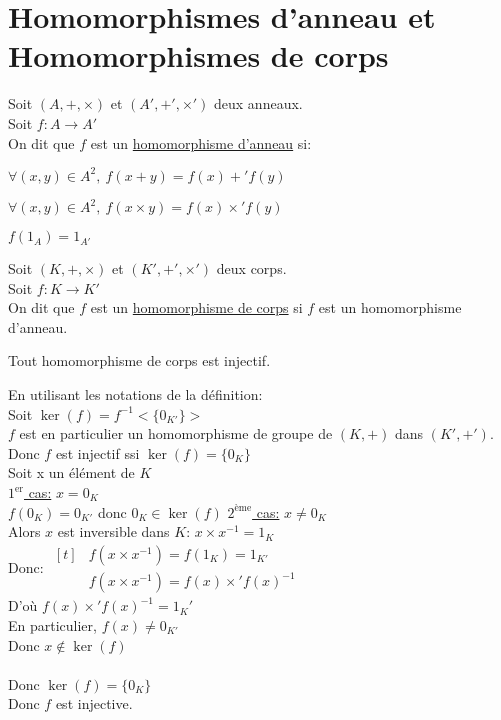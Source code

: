 \documentclass[12pt,twoside,a4paper]{article}
\begin{document}
	\section{Homomorphismes d'anneau et Homomorphismes de corps}
		\begin{defi}
			Soit $(A,+,\times)$ et $(A',+',\times')$ deux anneaux.\\
			Soit $f:A\rightarrow A'$\\
			On dit que $f$ est un \underline{homomorphisme d'anneau} si:
			\begin{liste}
				\item $\forall(x,y)\in A^2,\ f(x+y)=f(x)+'f(y)$
				\item $\forall(x,y)\in A^2,\ f(x\times y)=f(x)\times'f(y)$
				\item $f(1_A)=1_{A'}$
			\end{liste}
		\end{defi}
		\begin{defi}
				Soit $(K,+,\times)$ et $(K',+',\times')$ deux corps.\\
				Soit $f:K\rightarrow K'$\\
				On dit que $f$ est un \underline{homomorphisme de corps} si $f$ est un homomorphisme d'anneau.
		\end{defi}
		\begin{prop}
			Tout homomorphisme de corps est injectif.
		\end{prop}
		\begin{preuve}
			En utilisant les notations de la définition:\\
			Soit $\ker(f)=f^{-1}<\{0_{K'}\}>$\\
			$f$ est en particulier un homomorphisme de groupe de $(K,+)$ dans $(K',+')$. Donc $f$ est injectif ssi $\ker(f)=\{0_K\}$\\
			Soit x un élément de $K$\\
			\underline{$1^{\text{er}}$ cas:} $x=0_K$\\
			$f(0_K)=0_{K'}$ donc $0_K\in\ker(f)$
			\underline{$2^{\text{\`eme}}$ cas:} $x\neq0_K$\\
			Alors $x$ est inversible dans $K$: $x\times x^{-1}=1_K$\\
			Donc: 
			$\begin{aligned}[t]
			& f(x\times x^{-1})=f(1_K)=1_{K'}\\
			& f(x\times x^{-1})=f(x)\times'f(x)^{-1}
			\end{aligned}$\\
			D'o\`u $f(x)\times'f(x)^{-1}=1_K'$\\
			En particulier, $f(x)\neq 0_{K'}$\\
			Donc $x\notin \ker(f)$\\
			\\
			Donc $\ker(f)=\{0_K\}$\\
			Donc $f$ est injective.
		\end{preuve}
\end{document}
